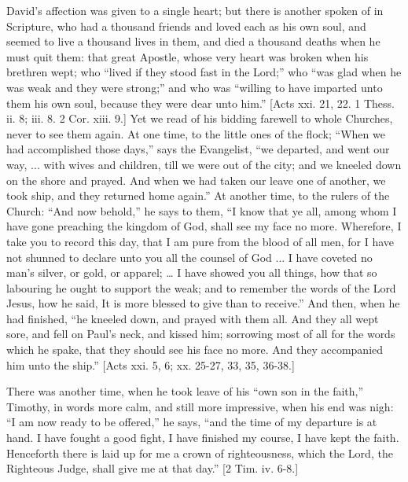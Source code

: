 David's affection was given to a single heart; but there is another
spoken of in Scripture, who had a thousand friends and loved each as
his own soul, and seemed to live a thousand lives in them, and died a
thousand deaths when he must quit them: that great Apostle, whose very
heart was broken when his brethren wept; who ``lived if they stood
fast in the Lord;'' who ``was glad when he was weak and they
were strong;'' and who was ``willing to have imparted unto
them his own soul, because they were dear unto him.'' [Acts xxi.
21, 22. 1 Thess. ii. 8; iii. 8. 2 Cor. xiii. 9.] Yet we read of his
bidding farewell to whole Churches, never to see them again. At one
time, to the little ones of the flock; ``When we had accomplished
those days,'' says the Evangelist, ``we departed, and went our
way, ... with wives and children, till we were out of the city; and we
kneeled down on the shore and prayed. And when we had taken our leave
one of another, we took ship, and they returned home again.'' At
another time, to the rulers of the Church: ``And now behold,''
he says to them, ``I know that ye all, among whom I have gone
preaching the kingdom of God, shall see my face no more. Wherefore, I
take you to record this day, that I am pure from the blood of all men,
for I have not shunned to declare unto you all the counsel of God ...
I have coveted no man's silver, or gold, or apparel; … I have showed
you all things, how that so labouring he ought to support the weak;
and to remember the words of the Lord Jesus, how he said, It is more
blessed to give than to receive.'' And then, when he had finished,
``he kneeled down, and prayed with them all. And they all wept
sore, and fell on Paul's neck, and kissed him; sorrowing most of all
for the words which he spake, that they should see his face no more.
And they accompanied him unto the ship.'' [Acts xxi. 5, 6; xx.
25-27, 33, 35, 36-38.]

There was another time, when he took leave of his ``own son in
the faith,'' Timothy, in words more calm, and still more
impressive, when his end was nigh: ``I am now ready to be
offered,'' he says, ``and the time of my departure is at hand.
I have fought a good fight, I have finished my course, I have kept the
faith. Henceforth there is laid up for me a crown of righteousness,
which the Lord, the Righteous Judge, shall give me at that day.''
[2 Tim. iv. 6-8.]


